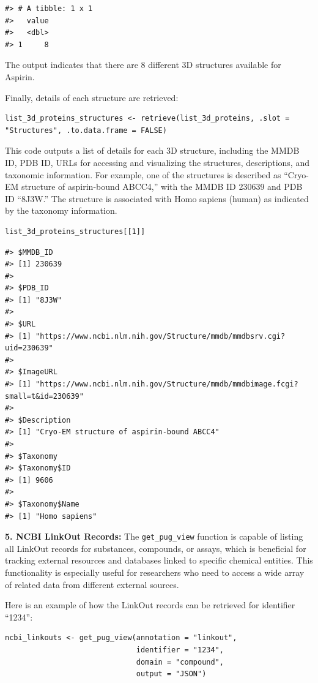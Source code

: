 \begin{verbatim}
#> # A tibble: 1 x 1
#>   value
#>   <dbl>
#> 1     8
\end{verbatim}

The output indicates that there are 8 different 3D structures available for Aspirin.

Finally, details of each structure are retrieved:

\begin{verbatim}
list_3d_proteins_structures <- retrieve(list_3d_proteins, .slot = "Structures", .to.data.frame = FALSE)
\end{verbatim}

This code outputs a list of details for each 3D structure, including the MMDB ID, PDB ID, URLs for accessing and visualizing the structures, descriptions, and taxonomic information. For example, one of the structures is described as ``Cryo-EM structure of aspirin-bound ABCC4,'' with the MMDB ID 230639 and PDB ID ``8J3W.'' The structure is associated with Homo sapiens (human) as indicated by the taxonomy information.

\begin{verbatim}
list_3d_proteins_structures[[1]]
\end{verbatim}

\begin{verbatim}
#> $MMDB_ID
#> [1] 230639
#> 
#> $PDB_ID
#> [1] "8J3W"
#> 
#> $URL
#> [1] "https://www.ncbi.nlm.nih.gov/Structure/mmdb/mmdbsrv.cgi?uid=230639"
#> 
#> $ImageURL
#> [1] "https://www.ncbi.nlm.nih.gov/Structure/mmdb/mmdbimage.fcgi?small=t&id=230639"
#> 
#> $Description
#> [1] "Cryo-EM structure of aspirin-bound ABCC4"
#> 
#> $Taxonomy
#> $Taxonomy$ID
#> [1] 9606
#> 
#> $Taxonomy$Name
#> [1] "Homo sapiens"
\end{verbatim}

\textbf{5. NCBI LinkOut Records:} The \texttt{get\_pug\_view} function is capable of listing all LinkOut records for substances, compounds, or assays, which is beneficial for tracking external resources and databases linked to specific chemical entities. This functionality is especially useful for researchers who need to access a wide array of related data from different external sources.

Here is an example of how the LinkOut records can be retrieved for identifier ``1234'':

\begin{verbatim}
ncbi_linkouts <- get_pug_view(annotation = "linkout", 
                              identifier = "1234", 
                              domain = "compound", 
                              output = "JSON")
\end{verbatim}

